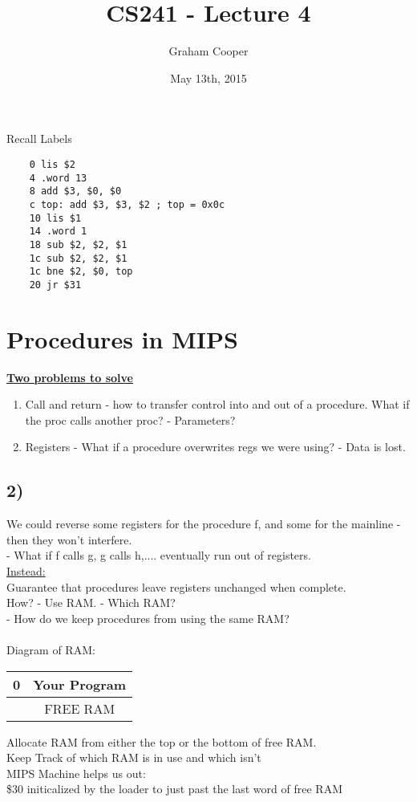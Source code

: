 \documentclass[12pt]{article}
\title{\vspace{-15ex}CS241 - Lecture 4\vspace{-1ex}}
\date{May 13th, 2015}
\author{Graham Cooper}
\newcommand{\myt}[1]{\textbf{\underline{#1}}}
\begin{document}
	\maketitle
	Recall Labels
	\lstset{language=[mips]Assembler}
	\begin{lstlisting}
	0 lis $2
	4 .word 13
	8 add $3, $0, $0
	c top: add $3, $3, $2 ; top = 0x0c
	10 lis $1
	14 .word 1
	18 sub $2, $2, $1
	1c sub $2, $2, $1
	1c bne $2, $0, top
	20 jr $31
	\end{lstlisting}
	
	\section*{Procedures in MIPS}
	\myt{Two problems to solve}
	\begin{enumerate} 
		\item Call and return - how to transfer control into and out of a procedure. What if the proc calls another proc? - Parameters?
		\item Registers - What if a procedure overwrites regs we were using? - Data is lost.
	\end{enumerate}
	
	\subsection*{2)}
	We could reverse some registers for the procedure f, and some for the mainline - then they won't interfere.\\
	- What if f calls g, g calls h,.... eventually run out of registers.\\
	\underline{Instead:}\\
	Guarantee that procedures leave registers unchanged when complete.\\
	How? - Use RAM. - Which RAM?\\
	- How do we keep procedures from using the same RAM?\\\\
	Diagram of RAM:\\
	
	\begin{tabular}{c| c |}
		0 & Your Program \\ \hline
		  & FREE RAM \\
	\end{tabular} 
	
	Allocate RAM from either the top or the bottom of free RAM.\\
	Keep Track of which RAM is in use and which isn't\\
	MIPS Machine helps us out:\\
	\$30 initicalized by the loader to just past the last word of free RAM\\
	
\end{document}
